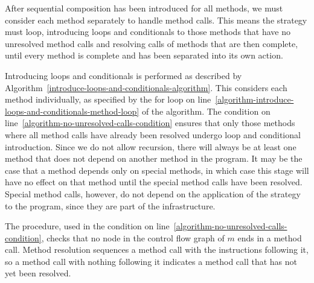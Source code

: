 After sequential composition has been introduced for all methods, we
must consider each method separately to handle method calls.
This means the strategy must loop, introducing loops and conditionals
to those methods that have no unresolved method calls and resolving
calls of methods that are then complete, until every method is
complete and has been separated into its own action.

Introducing loops and conditionals is performed as described by
Algorithm~\ref{introduce-loops-and-conditionals-algorithm}.
This considers each method individually, as specified by the for loop
on line~\ref{algorithm-introduce-loops-and-conditionals-method-loop}
of the algorithm. 
The condition on line~\ref{algorithm-no-unresolved-calls-condition}
ensures that only those methods where all method calls have already
been resolved undergo loop and conditional introduction.
Since we do not allow recursion, there will always be at least one
method that does not depend on another method in the program.
It may be the case that a method depends only on special methods, in
which case this stage will have no effect on that method until the
special method calls have been resolved.
Special method calls, however, do not depend on the application of the
strategy to the program, since they are part of the infrastructure.

The  procedure, used in the condition
on line~\ref{algorithm-no-unresolved-calls-condition}, checks that no
node in the control flow graph of $m$ ends in a method call.
Method resolution sequences a method call with the instructions
following it, so a method call with nothing following it indicates a
method call that has not yet been resolved.

